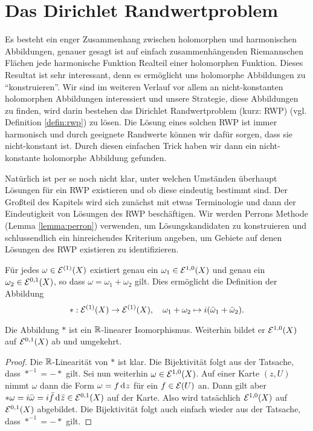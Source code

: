
\section{Das Dirichlet Randwertproblem}
\label{sec:Dirichlet}

Es besteht ein enger Zusammenhang zwischen holomorphen und
harmonischen Abbildungen, genauer gesagt ist auf einfach
zusammenhängenden Riemannschen Flächen jede harmonische Funktion
Realteil einer holomorphen Funktion. Dieses Resultat ist sehr
interessant, denn es ermöglicht uns holomorphe Abbildungen zu
"`konstruieren"'. Wir sind im weiteren Verlauf vor allem an
nicht-konstanten holomorphen Abbildungen interessiert und unsere
Strategie, diese Abbildungen zu finden, wird darin bestehen das
Dirichlet Randwertproblem (kurz: RWP) (vgl. Definition
\ref{defin:rwp}) zu lösen. Die Lösung eines solchen RWP ist immer
harmonisch und durch geeignete Randwerte können wir dafür sorgen, dass
sie nicht-konstant ist. Durch diesen einfachen Trick haben wir dann
ein nicht-konstante holomorphe Abbildung gefunden.

Natürlich ist per se noch nicht klar, unter welchen Umständen
überhaupt Lösungen für ein RWP existieren und ob diese eindeutig
bestimmt sind. Der Großteil des Kapitels wird sich zunächst mit etwas
Terminologie und dann der Eindeutigkeit von Lösungen des RWP
beschäftigen. Wir werden Perrons Methode (Lemma \ref{lemma:perron})
verwenden, um Lösungskandidaten zu konstruieren und schlussendlich ein
hinreichendes Kriterium angeben, um Gebiete auf denen Lösungen des RWP
existieren zu identifizieren.

\begin{defin}
  Für jedes $\omega \in \mathcal{E}^{(1)}(X)$ existiert genau ein $\omega_1
  \in \mathcal{E}^{1,0}(X)$ und genau ein $\omega_2 \in \mathcal{E}^{0,1}(X)$, so
  dass $\omega = \omega_1 + \omega_2$ gilt. Dies ermöglicht die
  Definition der Abbildung
  \[
  \ast : \mathcal{E}^{(1)}(X) \rightarrow \mathcal{E}^{(1)}(X), \quad \omega_1 + \omega_2
  \mapsto i(\bar \omega_1 + \bar \omega_2).
  \]
\end{defin}

\begin{prop}
  Die Abbildung $\ast$ ist ein $\mathbb{R}$-linearer Isomorphismus. Weiterhin
  bildet er $\mathcal{E}^{1,0}(X)$ auf $\mathcal{E}^{0,1}(X)$ ab und umgekehrt.
\end{prop}

\begin{proof}
  Die $\mathbb{R}$-Linearität von $\ast$ ist klar. Die Bijektivität folgt aus
  der Tatsache, dass $\ast^{-1} = - \ast$ gilt. Sei nun weiterhin
  $\omega \in \mathcal{E}^{1,0}(X)$. Auf einer Karte $(z,U)$ nimmt $\omega$
  dann die Form $\omega = f \d[z]$ für ein $f \in \mathcal{E}(U)$ an. Dann gilt
  aber $\ast \omega = i \bar \omega = i \bar f \d[\bar z] \in
  \diff^{0,1}(X)$ auf der Karte. Also wird tatsächlich
  $\mathcal{E}^{1,0}(X)$ auf $\mathcal{E}^{0,1}(X)$ abgebildet. Die Bijektivität
  folgt auch einfach wieder aus der Tatsache, dass $\ast^{-1} = -
  \ast$ gilt.
\end{proof}

